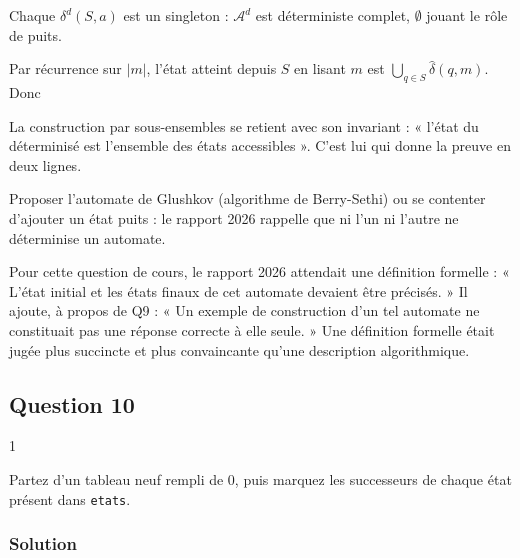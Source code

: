 \documentclass[11pt,a4paper]{article}
\newcommand{\equationajustee}[1]{%
  \sbox{\boiteequation}{$\displaystyle #1$}%
  \ifdim\wd\boiteequation>\linewidth
    \[\resizebox{\linewidth}{!}{\usebox{\boiteequation}}\]%
  \else
    \[#1\]%
  \fi}
\begin{document}
Chaque \(\delta^d(S,a)\) est un singleton : \({\mathcal{A}}^d\) est déterministe complet, \(\emptyset\) jouant le rôle de puits.

Par récurrence sur \(|m|\), l'état atteint depuis \(S\) en lisant \(m\) est \(\bigcup_{q\in S}\widehat\delta(q,m)\). Donc

\equationajustee{m\in\mathcal{L}({\mathcal{A}}^d)\iff\widehat\delta(q_0,m)\cap F\ne\emptyset\iff m\in\mathcal{L}(\mathcal{A}).}

\begin{methode}

La construction par sous-ensembles se retient avec son invariant : « l'état du déterminisé est l'ensemble des états accessibles ». C'est lui qui donne la preuve en deux lignes.

\end{methode}

\begin{piege}

Proposer l'automate de Glushkov (algorithme de Berry-Sethi) ou se contenter d'ajouter un état puits : le rapport 2026 rappelle que ni l'un ni l'autre ne déterminise un automate.

\end{piege}

\begin{jury}

Pour cette question de cours, le rapport 2026 attendait une définition formelle : « L'état initial et les états finaux de cet automate devaient être précisés. » Il ajoute, à propos de Q9 : « Un exemple de construction d'un tel automate ne constituait pas une réponse correcte à elle seule. » Une définition formelle était jugée plus succincte et plus convaincante qu'une description algorithmique.

\end{jury}

\hypertarget{question-10}{%
\subsection{Question 10}\label{question-10}}

\begin{indication}{1}

Partez d'un tableau neuf rempli de 0, puis marquez les successeurs de chaque état présent dans \texttt{etats}.

\end{indication}

\hypertarget{solution-9}{%
\subsubsection{Solution}\label{solution-9}}
\end{document}
